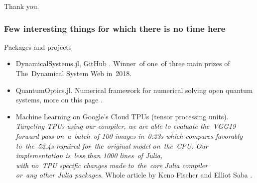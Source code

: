\documentclass{beamer}  %
\begin{document}
\begin{frame}

  \begin{center}
    \LARGE Thank you.
  \end{center}

\end{frame}












\begin{frame}
  \frametitle{Few interesting things for which there is no time here}

  \begin{block}{Packages and projects}
    \begin{itemize}
    \item DynamicalSystems.jl, GitHub
      .
      Winner~of one~of three main prizes of The~Dynamical System Web
      in~2018.
    \item QuantumOptics.jl. Numerical framework for numerical solving
      open quantum systems, more on this page
      .
    \item Machine Learning on Google's Cloud TPUs (tensor processing
      units). \\
      \emph{Targeting TPUs using our compiler, we are able to evaluate
        the~VGG19 forward pass on~a~batch~of 100 images in~0.23s which
        compares favorably to~the~52.4s required for~the~original
        model on~the~CPU. Our implementation is~less than 1000
        lines~of Julia, \\
        with no~TPU specific changes made to~the~core
        Julia compiler \\
        or~any other Julia packages.} Whole article by Keno Fischer
      and Elliot Saba
      .
    \end{itemize}
  \end{block}

\end{frame}
\end{document}
